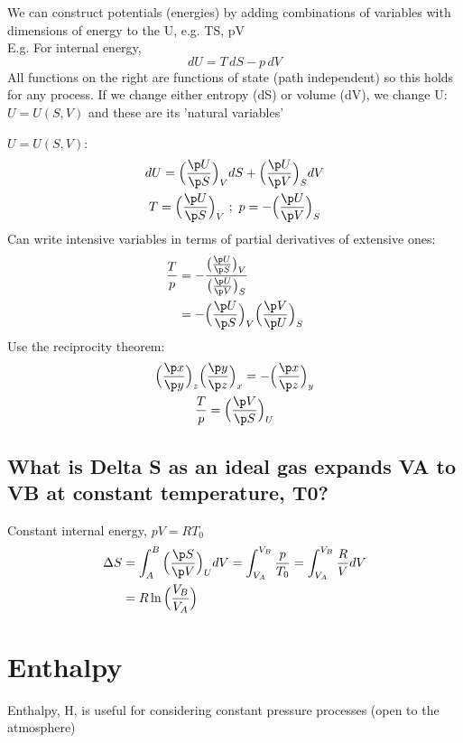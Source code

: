 \documentclass[a4paper, 11pt, normalem]{report}
\begin{document}
We can construct potentials (energies) by adding combinations of variables with dimensions of energy to the U, e.g. TS, pV \\
E.g. For internal energy,
\begin{equation*}
    dU = T\,dS - p\,dV
\end{equation*}
All functions on the right are functions of state (path independent) so this holds for any process. If we change either entropy (dS) or volume (dV), we change U: $U = U(S,V)$ and these are its 'natural variables'

$U = U(S,V)$:
\begin{gather*}
    dU = \Big(\frac{\p U}{\p S}\Big)_V dS + \Big(\frac{\p U}{\p V}\Big)_S dV \\
    T = \Big(\frac{\p U}{\p S}\Big)_V ~;~ p = -\Big(\frac{\p U}{\p V}\Big)_S
\end{gather*}
Can write intensive variables in terms of partial derivatives of extensive ones:
\begin{align*}
    \frac{T}{p} &= -\frac{\big(\tfrac{\p U}{\p S}\big)_V}{\big(\tfrac{\p U}{\p V}\big)_S} \\
    &= -\Big(\frac{\p U}{\p S}\Big)_V \Big(\frac{\p V}{\p U}\Big)_S
\end{align*}
Use the reciprocity theorem:
\begin{gather*}
    \Big(\frac{\p x}{\p y}\Big)_z \Big(\frac{\p y}{\p z}\Big)_x = -\Big(\frac{\p x}{\p z}\Big)_y \\
    \frac{T}{p} = \Big(\frac{\p V}{\p S}\Big)_U
\end{gather*}

\subsection{What is Delta S as an ideal gas expands VA to VB at constant temperature, T0?}
Constant internal energy, $pV = RT_0$
\begin{align*}
    \Delta S &= \int_{A}^{B} \Big(\frac{\p S}{\p V}\Big)_U dV = \int_{V_A}^{V_B} \frac{p}{T_0} = \int_{V_A}^{V_B} \frac{R}{V}dV \\
    &= R\ln\Big(\frac{V_B}{V_A}\Big)
\end{align*}

\section{Enthalpy}
Enthalpy, H, is useful for considering constant pressure processes (open to the atmosphere)
\end{document}
